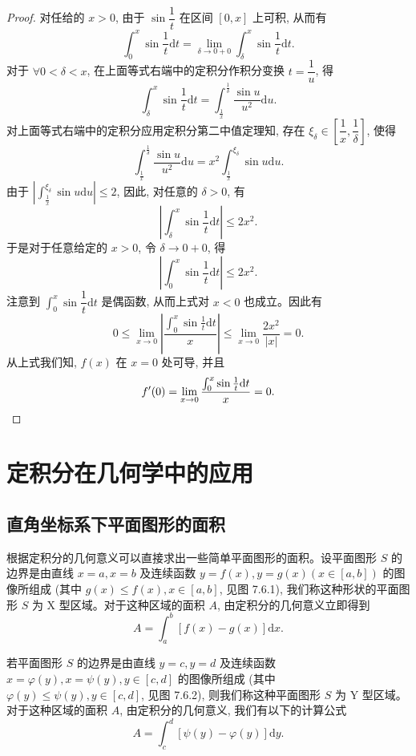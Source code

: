 \begin{proof}
对任给的 $x>0$, 由于 $\sin\dfrac{1}{t}$ 在区间 $[0,x]$ 上可积, 从而有
\[
  \int_0^x \sin\frac{1}{t}\mathrm dt=\lim_{\delta\to0+0}\int_\delta^x \sin\frac{1}{t}\mathrm dt.
\]
对于 $\forall 0<\delta<x$, 在上面等式右端中的定积分作积分变换 $t=\dfrac{1}{u}$, 得
\[
  \int_\delta^x \sin\frac{1}{t}\mathrm dt
  =\int_{\frac{1}{x}}^{\frac{1}{\delta}}\frac{\sin u}{u^2}\mathrm du.
\]
对上面等式右端中的定积分应用定积分第二中值定理知, 存在 $\xi_\delta\in\left[\dfrac{1}{x},\dfrac{1}{\delta}\right]$, 使得
\[
  \int_{\frac{1}{x}}^{\frac{1}{\delta}}\frac{\sin u}{u^2}\mathrm du
  =x^2\int_{\frac{1}{x}}^{\xi_\delta}\sin u\mathrm du.
\]
由于 $\left|\int_{\frac{1}{x}}^{\xi_\delta}\sin u\mathrm du\right|\leq2$, 因此, 对任意的 $\delta>0$, 有
\[
  \left|\int_\delta^x \sin\frac{1}{t}\mathrm dt\right|\leq2x^2.
\]
于是对于任意给定的 $x>0$, 令 $\delta\to0+0$, 得
\[
  \left|\int_0^x \sin\frac{1}{t}\mathrm dt\right|\leq2x^2.
\]
注意到 $\int_0^x\sin\dfrac{1}{t}\mathrm dt$ 是偶函数, 从而上式对 $x<0$ 也成立。因此有
\[
  0\leq\lim_{x\to0}\left|\frac{\int_0^x\sin\frac{1}{t}\mathrm dt}{x}\right|
  \leq\lim_{x\to0}\frac{2x^2}{|x|}=0.
\]
从上式我们知, $f(x)$ 在 $x=0$ 处可导, 并且
\[
  f'(0)=\lim_{x\to0}\frac{\int_0^x\sin\frac{1}{t}\mathrm dt}{x}=0.
\qedhere
\]
\end{proof}


\section{定积分在几何学中的应用}
\label{sec:ma-7-6}

\subsection{直角坐标系下平面图形的面积}
\label{subsec:ma-7-6-1}

根据定积分的几何意义可以直接求出一些简单平面图形的面积。设平面图形 $S$ 的边界是由直线 $x=a,x=b$ 及连续函数 $y=f(x),y=g(x)(x\in[a,b])$ 的图像所组成 (其中 $g(x)\leq f(x),x\in[a,b]$, 见图 7.6.1), 我们称这种形状的平面图形 $S$ 为 X 型区域。对于这种区域的面积 $A$, 由定积分的几何意义立即得到
\[
  A=\int_a^b [f(x)-g(x)]\mathrm dx.
\]

若平面图形 $S$ 的边界是由直线 $y=c,y=d$ 及连续函数 $x=\varphi(y),x=\psi(y),y\in[c,d]$ 的图像所组成 (其中 $\varphi(y)\leq\psi(y),y\in[c,d]$, 见图 7.6.2), 则我们称这种平面图形 $S$ 为 Y 型区域。对于这种区域的面积 $A$, 由定积分的几何意义, 我们有以下的计算公式
\[
  A=\int_c^d [\psi(y)-\varphi(y)]\mathrm dy.
\]

